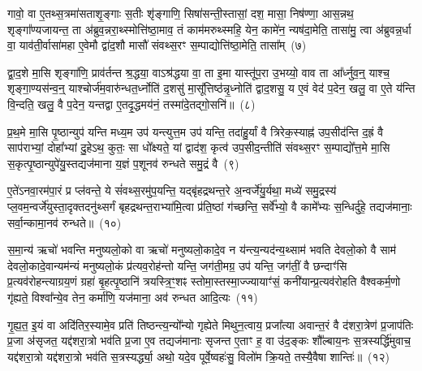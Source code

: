 {\anuvakamend[{गो॒स॒त्रं वा ए॑ति संवथ्स॒रो᳚\-ऽर्धमा॒सा मि॑थु॒नं म॑ध्य॒तो दे॑व॒याने॑नै॒व वी॒र्य॑न्त्रयो॑दश च}]}

गावो॒ वा ए॒तथ्स॒त्रमा॑सताशृ॒ङ्गाः स॒तीः शृ॑ङ्गाणि॒ सिषा॑सन्ती॒स्तासां॒ दश॒ मासा॒ निष॑ण्णा॒ आस॒न्नथ॒ शृङ्गा᳚ण्यजायन्त॒ ता अ॑ब्रुव॒न्नरा॒थ्स्मोत्ति॑ष्ठा॒माव॒ तं काम॑मरुथ्स्महि॒ येन॒ कामे॑न॒ न्यष॑दा॒मेति॒ तासा॑मु॒ त्वा अ॑ब्रुवन्न॒र्धा वा॒ याव॑ती॒र्वासा॑महा ए॒वेमौ द्वा॑द॒शौ मासौ॑ संवथ्स॒रꣳ स॒म्पाद्योत्ति॑ष्ठा॒मेति॒ तासा᳚म्~(७)\ip

द्वा॒द॒शे मा॒सि शृङ्गा॑णि॒ प्राव॑र्तन्त श्र॒द्धया॒ वा\-ऽश्र॑द्धया वा॒ ता इ॒मा यास्तू॑प॒रा उ॒भय्यो॒ वाव ता आ᳚र्ध्नुव॒न्॒ याश्च॒ शृङ्गा॒ण्यस॑न्व॒न्॒ याश्चोर्ज॑म॒वारु॑न्धत॒र्ध्नोति॑ द॒शसु॑ मा॒सू᳚त्तिष्ठ॑न्नृ॒ध्नोति॑ द्वाद॒शसु॒ य ए॒वं वेद॑ प॒देन॒ खलु॒ वा ए॒ते य॑न्ति वि॒न्दति॒ खलु॒ वै प॒देन॒ यन्तद्वा ए॒तदृ॒द्धमय॑नं॒ तस्मा॑दे॒तद्गो॒सनि॑॥~(८)\ip

{\anuvakamend[{ति॒ष्ठा॒मेति॒ तासां॒ तस्मा॒द्द्वे च॑}]}

प्र॒थ॒मे मा॒सि पृ॒ष्ठान्युप॑ यन्ति मध्य॒म उप॑ यन्त्युत्त॒म उप॑ यन्ति॒ तदा॑हु॒र्यां वै त्रिरेक॒स्याह्न॑ उप॒सीद॑न्ति द॒ह्रं वै साप॑राभ्यां॒ दोहा᳚भ्यां दु॒हे\-ऽथ॒ कुतः॒ सा धो᳚क्ष्यते॒ यां द्वाद॑श॒ कृत्व॑ उप॒सीद॒न्तीति॑ संवथ्स॒रꣳ स॒म्पाद्यो᳚त्त॒मे मा॒सि स॒कृत्पृ॒ष्ठान्युपे॑यु॒स्तद्यज॑माना य॒ज्ञं प॒शूनव॑ रुन्धते समु॒द्रं वै~(९)\ip

ए॒ते॑\-ऽनवा॒रम॑पा॒रं प्र प्ल॑वन्ते॒ ये सं॑वथ्स॒रमु॑प॒यन्ति॒ यद्बृ॑हद्रथन्त॒रे अ॒न्वर्जे॑यु॒र्यथा॒ मध्ये॑ समु॒द्रस्य॑ प्ल॒वम॒न्वर्जे॑युस्ता॒दृक्त\-दनु॑थ्सर्गं बृहद्रथन्त॒राभ्या॑मि॒त्वा प्र॑ति॒ष्ठां ग॑च्छन्ति॒ सर्वे᳚भ्यो॒ वै कामे᳚भ्यः स॒न्धिर्दु॑हे॒ तद्यज॑मानाः॒ सर्वा॒न्कामा॒नव॑ रुन्धते॥~(१०)\ip

{\anuvakamend[{स॒मु॒द्रं वै चतु॑स्त्रिꣳशच्च}]}

स॒मा॒न्य॑ ऋचो॑ भवन्ति मनुष्यलो॒को वा ऋचो॑ मनुष्यलो॒कादे॒व न य॑न्त्य॒न्यद॑न्य॒थ्साम॑ भवति देवलो॒को वै साम॑ देवलो॒कादे॒वान्यम॑न्यं मनुष्यलो॒कं प्र॑त्यव॒रोह॑न्तो यन्ति॒ जग॑ती॒मग्र॒ उप॑ यन्ति॒ जग॑तीं॒ वै छन्दाꣳ॑सि प्र॒त्यव॑रोहन्त्याग्रय॒णं ग्रहा॑ बृ॒हत्पृ॒ष्ठानि॑ त्रयस्त्रि॒ꣳ॒शꣴ स्तोमा॒स्तस्मा॒ज्ज्यायाꣳ॑सं॒ कनी॑यान्प्र॒त्यव॑रोहति वैश्वकर्म॒णो गृ॑ह्यते॒ विश्वा᳚न्ये॒व तेन॒ कर्मा॑णि॒ यज॑माना॒ अव॑ रुन्धत आदि॒त्यः~(११)\ip

गृ॒ह्य॒त॒ इ॒यं वा अदि॑तिर॒स्यामे॒व प्रति॑ तिष्ठन्त्य॒न्यो᳚न्यो गृह्येते मिथुन॒त्वाय॒ प्रजा᳚त्या अवान्त॒रं वै द॑शरा॒त्रेण॑ प्र॒जा\-प॑तिः प्र॒जा अ॑सृजत॒ यद्द॑शरा॒त्रो भव॑ति प्र॒जा ए॒व तद्यज॑मानाः सृजन्त ए॒ताꣳ ह॒ वा उ॑द॒ङ्कः शौ᳚ल्बाय॒नः स॒त्रस्यर्द्धि॑मुवाच॒ यद्द॑शरा॒त्रो यद्द॑शरा॒त्रो भव॑ति स॒त्रस्यर्द्ध्या॒ अथो॒ यदे॒व पूर्वे॒ष्वहः॑सु॒ विलो॑म क्रि॒यते॒ तस्यै॒वैषा शान्तिः॑॥~(१२)\ip

